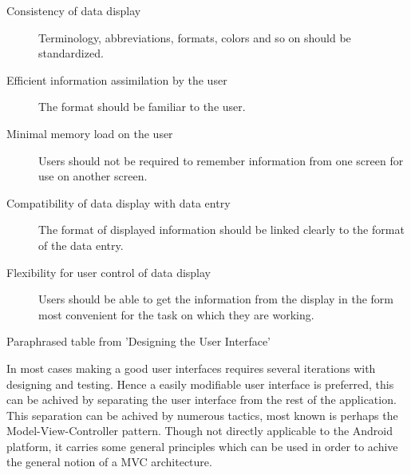 		\begin{table}[H]
		\begin{description}
			\item[Consistency of data display] Terminology, abbreviations, formats, colors and so on should be standardized.
			\item[Efficient information assimilation by the user] The format should be familiar to the user. 
			\item[Minimal memory load on the user] Users should not be required to remember information from one screen for use on another screen.
			\item[Compatibility of data display with data entry] The format of displayed information should be linked clearly to the format of the data entry.
			\item[Flexibility for user control of data display] Users should be able to get the information from the display in the form most convenient for the task on which they are working.
		\end{description}
		\caption{Paraphrased table from 'Designing the User Interface'\cite[p. 77]{bib:uidesign}}
		\label{tab:uidesign}
		\end{table}


		In most cases making a good user interfaces requires several iterations with designing and testing. Hence a easily modifiable user interface is preferred, this can be achived by separating the user interface from the rest of the application. This separation can be achived by numerous tactics, most known is perhaps the Model-View-Controller pattern. Though not directly applicable to the Android platform, it carries some general principles which can be used in order to achive the general notion of a MVC architecture. 
		
